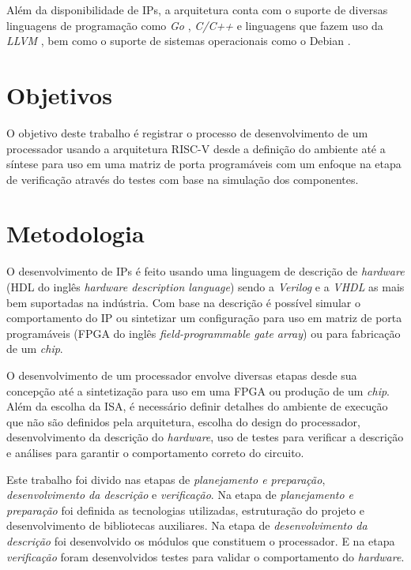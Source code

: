 Além da disponibilidade de IPs, a arquitetura conta com o suporte de diversas 
linguagens de programação como \emph{Go} \citep{GOL}, \emph{C/C++} \citep{RVGCC} e
linguagens que fazem uso da \emph{LLVM} \citep{RVLLVM}, bem como o suporte de sistemas 
operacionais como o Debian \citep{RVDB}.

\section{Objetivos}
\label{sec:io}

O objetivo deste trabalho é registrar o processo de desenvolvimento de um processador 
usando a arquitetura RISC-V desde a definição do ambiente até a síntese para uso em uma 
matriz de porta programáveis com um enfoque na etapa de verificação através do testes 
com base na simulação dos componentes.

\section{Metodologia}
\label{sec:im}

O desenvolvimento de IPs é feito usando uma linguagem de descrição de \emph{hardware} 
(HDL do inglês \emph{hardware description language}) sendo a \emph{Verilog} e a 
\emph{VHDL} as mais bem suportadas na indústria. Com base na descrição é possível 
simular o comportamento do IP ou sintetizar um configuração para uso em 
matriz de porta programáveis (FPGA do inglês \emph{field-programmable gate array}) ou 
para fabricação de um \emph{chip}.

O desenvolvimento de um processador envolve diversas etapas desde sua concepção até a sintetização para
uso em uma FPGA ou produção de um \emph{chip}. 
Além da escolha da ISA, é necessário definir detalhes do ambiente 
de execução que não são definidos pela arquitetura, escolha do design do processador, desenvolvimento da 
descrição do \emph{hardware}, uso de testes para verificar a descrição e análises para garantir o comportamento
correto do circuito.

Este trabalho foi divido nas etapas de \emph{planejamento e preparação}, 
\emph{desenvolvimento da descrição} e \emph{verificação}.
Na etapa de \emph{planejamento e preparação} foi definida as tecnologias utilizadas,
estruturação do projeto e desenvolvimento de bibliotecas auxiliares. 
Na etapa de \emph{desenvolvimento da descrição} foi desenvolvido os módulos que constituem o
processador. E na etapa
\emph{verificação} foram desenvolvidos testes para validar o comportamento do \emph{hardware}.

